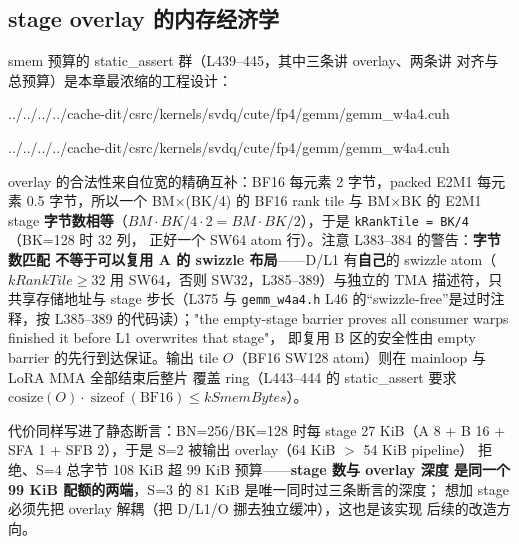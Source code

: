 \subsection{stage overlay 的内存经济学}\label{sec:40-overlay}

smem 预算的 static\_assert 群（L439--445，其中三条讲 overlay、两条讲
对齐与总预算）是本章最浓缩的工程设计：

\begin{lstinputlisting}[linerange={375-393},firstnumber=auto,
  title={gemm\_w4a4.cuh L375-393（overlay 的字节论证与 D/L1 布局）}]{../../../../cache-dit/csrc/kernels/svdq/cute/fp4/gemm/gemm_w4a4.cuh}
\end{lstinputlisting}

\begin{lstinputlisting}[linerange={439-454},firstnumber=auto,
  title={gemm\_w4a4.cuh L439-454（overlay 与预算的 static\_assert + TMA 事务字节）}]{../../../../cache-dit/csrc/kernels/svdq/cute/fp4/gemm/gemm_w4a4.cuh}
\end{lstinputlisting}

overlay 的合法性来自位宽的精确互补：BF16 每元素 2 字节，packed E2M1
每元素 0.5 字节，所以一个 BM$\times$(BK/4) 的 BF16 rank tile 与
BM$\times$BK 的 E2M1 stage \textbf{字节数相等}（$BM\cdot BK/4\cdot2
=BM\cdot BK/2$），于是 \texttt{kRankTile = BK/4}（BK=128 时 32 列，
正好一个 SW64 atom 行）。注意 L383--384 的警告：\textbf{字节数匹配
不等于可以复用 A 的 swizzle 布局}——D/L1 有\textbf{自己}的 swizzle
atom（$kRankTile\ge32$ 用 SW64，否则 SW32，L385--389）与独立的 TMA
描述符，只共享存储地址与 stage 步长（L375 与 \texttt{gemm\_w4a4.h} L46
的“swizzle-free”是过时注释，按 L385--389 的代码读）；"the empty-stage barrier
proves all consumer warps finished it before L1 overwrites that stage"，
即复用 B 区的安全性由 empty barrier 的先行到达保证。输出 tile
$O$（BF16 SW128 atom）则在 mainloop 与 LoRA MMA 全部结束后整片
覆盖 ring（L443--444 的 static\_assert 要求
$\mathrm{cosize}(O)\cdot\operatorname{sizeof}(\mathrm{BF16})\le kSmemBytes$）。

代价同样写进了静态断言：BN=256/BK=128 时每 stage 27 KiB（A 8 + B 16 +
SFA 1 + SFB 2），于是 S=2 被输出 overlay（64 KiB $>$ 54 KiB pipeline）
拒绝、S=4 总字节 108 KiB 超 99 KiB 预算——\textbf{stage 数与 overlay 深度
是同一个 99 KiB 配额的两端}，S=3 的 81 KiB 是唯一同时过三条断言的深度；
想加 stage 必须先把 overlay 解耦（把 D/L1/O 挪去独立缓冲），这也是该实现
后续的改造方向。

